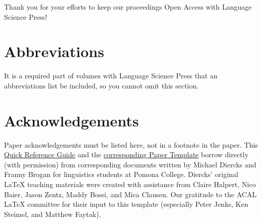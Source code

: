 \documentclass[output=paper,colorlinks,citecolor=brown,
]{langscibook}
\begin{document}
Thank you for your efforts to keep our proceedings Open Access with Language Science Press! 

\section*{Abbreviations}

It is a required part of volumes with Language Science Press that an abbreviations list be included, so you cannot omit this section.

\section*{Acknowledgements}

Paper acknowledgements must be listed here, not in a footnote in the paper. This \href{https://www.overleaf.com/latex/templates/acal-proceedings-latex-quick-reference-guide/fncrcrtgnxhv}{Quick Reference Guide} and the \href{https://www.overleaf.com/latex/templates/acal-proceedings-template/kxmngmsjvfqq}{corresponding Paper Template} borrow directly (with permission) from corresponding documents written by Michael Diercks and Franny Brogan for linguistics students at Pomona College. Diercks' original \LaTeX{} teaching materials were created with assistance from Claire Halpert, Nico Baier, Jason Zentz, Maddy Bossi, and Mica Clausen. Our gratitude to the ACAL \LaTeX{} committee for their input to this template (especially Peter Jenks, Ken Steimel, and Matthew Faytak). 

\sloppy %
\printbibliography[heading=subbibliography,notkeyword=this]
\end{document}
